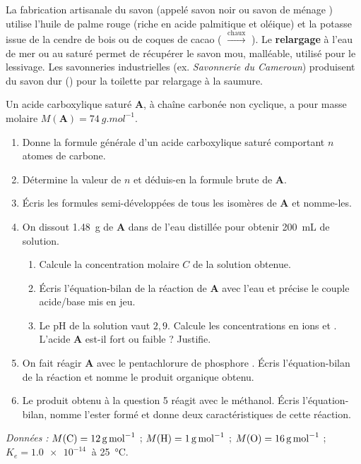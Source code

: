 \documentclass[11pt]{article}
\newcounter{popsec}
\newcounter{popsub}
\newcommand{\courssub}[1]{%
  \stepcounter{popsub}%
  \par\vspace{9pt}\noindent{\popxbold\fontsize{11.5}{13}\selectfont\color{popink}{\color{poporange}\thepopsec.\thepopsub}\hspace{6pt}#1}\par\nopagebreak\vspace{4pt}
}
\begin{document}
\begin{savaistu}
La fabrication artisanale du savon (appelé \og savon noir \fg{} ou \og savon de ménage \fg{}) utilise l'huile de palme rouge (riche en acide palmitique et oléique) et la potasse issue de la cendre de bois ou de coques de cacao ( $\xrightarrow{\text{chaux}}$ ). Le \textbf{relargage} à l'eau de mer ou au  saturé permet de récupérer le savon mou, malléable, utilisé pour le lessivage. Les savonneries industrielles (ex. \emph{Savonnerie du Cameroun}) produisent du savon dur () pour la toilette par relargage à la saumure.
\end{savaistu}

\courssub{Je me prépare au Bac}

\begin{exercice}
Un acide carboxylique saturé \textbf{A}, à chaîne carbonée non cyclique, a pour masse molaire $M(\textbf{A}) = \SI{74}{g.mol^{-1}}$.
\begin{enumerate}
\item Donne la formule générale d'un acide carboxylique saturé comportant $n$ atomes de carbone.
\item Détermine la valeur de $n$ et déduis-en la formule brute de \textbf{A}.
\item Écris les formules semi-développées de tous les isomères de \textbf{A} et nomme-les.
\item On dissout \SI{1,48}{g} de \textbf{A} dans de l'eau distillée pour obtenir \SI{200}{mL} de solution.
\begin{enumerate}
\item[a)] Calcule la concentration molaire $C$ de la solution obtenue.
\item[b)] Écris l'équation-bilan de la réaction de \textbf{A} avec l'eau et précise le couple acide/base mis en jeu.
\item[c)] Le pH de la solution vaut $2{,}9$. Calcule les concentrations en ions  et . L'acide \textbf{A} est-il fort ou faible ? Justifie.
\end{enumerate}
\item On fait réagir \textbf{A} avec le pentachlorure de phosphore . Écris l'équation-bilan de la réaction et nomme le produit organique obtenu.
\item Le produit obtenu à la question 5 réagit avec le méthanol. Écris l'équation-bilan, nomme l'ester formé et donne deux caractéristiques de cette réaction.
\end{enumerate}
\emph{Données :} $M(\ce{C}) = \SI{12}{g.mol^{-1}}$ ; $M(\ce{H}) = \SI{1}{g.mol^{-1}}$ ; $M(\ce{O}) = \SI{16}{g.mol^{-1}}$ ; $K_e = \SI{1,0e-14}{}$ à \SI{25}{\celsius}.
\end{exercice}
\end{document}
